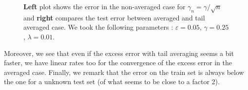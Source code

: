 \begin{figure}[ht]
\footnotesize
{}%
\hspace{1cm}%
\caption{ \small {\bfseries Left} plot shows the error in the non-averaged case for $\gamma_n = \gamma / \sqrt{n}$ and {\bfseries right} compares the test error between averaged and tail averaged case. We took the following parameters :  $\varepsilon = 0.05$, $\gamma = 0.25$, $\lambda = 0.01$.}
\label{fig:techplots}
\end{figure}

Moreover, we see that even if the excess error with tail averaging seems a bit faster, we have linear rates too for the convergence of the excess error in the averaged case. Finally, we remark that the error on the train set is always below the one for a unknown test set (of what seems to be close to a factor 2).




